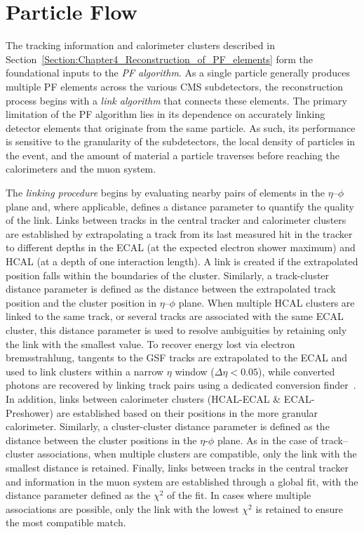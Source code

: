 \section{Particle Flow}
The tracking information and calorimeter clusters described in Section~\ref{Section:Chapter4_Reconstruction_of_PF_elements} form the foundational inputs to the \textit{\ac{PF} algorithm}. As a single particle generally produces multiple \ac{PF} elements across the various \ac{CMS} subdetectors, the reconstruction process begins with a \textit{link algorithm} that connects these elements. The primary limitation of the \ac{PF} algorithm lies in its dependence on accurately linking detector elements that originate from the same particle. As such, its performance is sensitive to the granularity of the subdetectors, the local density of particles in the event, and the amount of material a particle traverses before reaching the calorimeters and the muon system.

The \textit{linking procedure} begins by evaluating nearby pairs of elements in the $\eta$–$\phi$ plane and, where applicable, defines a distance parameter to quantify the quality of the link. Links between tracks in the central tracker and calorimeter clusters are established by extrapolating a track from its last measured hit in the tracker to different depths in the \ac{ECAL} (at the expected electron shower maximum) and \ac{HCAL} (at a depth of one interaction length). A link is created if the extrapolated position falls within the boundaries of the cluster. Similarly, a track-cluster distance parameter is defined as the distance between the extrapolated track position and the cluster position in $\eta$–$\phi$ plane. When multiple \ac{HCAL} clusters are linked to the same track, or several tracks are associated with the same \ac{ECAL} cluster, this distance parameter is used to resolve ambiguities by retaining only the link with the smallest value. To recover energy lost via electron bremsstrahlung, tangents to the \ac{GSF} tracks are extrapolated to the \ac{ECAL} and used to link clusters within a narrow $\eta$ window ($\Delta\eta < 0.05$), while converted photons are recovered by linking track pairs using a dedicated conversion finder~\cite{DedicatedConversionFinder}. In addition, links between calorimeter clusters (\ac{HCAL}-\ac{ECAL} \& \ac{ECAL}-Preshower) are established based on their positions in the more granular calorimeter. Similarly, a cluster-cluster distance parameter is defined as the distance between the cluster positions in the $\eta$-$\phi$ plane. As in the case of track–cluster associations, when multiple clusters are compatible, only the link with the smallest distance is retained. Finally, links between tracks in the central tracker and information in the muon system are established through a global fit, with the distance parameter defined as the $\chi^2$ of the fit. In cases where multiple associations are possible, only the link with the lowest $\chi^2$ is retained to ensure the most compatible match.


